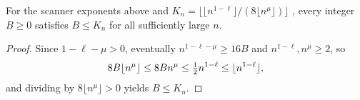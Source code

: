 \begin{lemma}
    \label{thm:area_law_band_count_growth}
    \leanok
    For the scanner exponents above and
    $K_n=\lfloor\lfloor n^{1-\ell}\rfloor/(8\lfloor n^\mu\rfloor)\rfloor$
    \cite[Section~9]{OpenAI2026AreaLaw}, every integer $B\ge0$ satisfies
    $B\le K_n$ for all sufficiently large $n$.
\end{lemma}
\begin{proof}\leanok
    Since $1-\ell-\mu>0$, eventually $n^{1-\ell-\mu}\ge16B$ and
    $n^{1-\ell},n^\mu\ge2$, so
    \begin{align}
        8B\lfloor n^\mu\rfloor
        \le8Bn^\mu
        \le\tfrac12 n^{1-\ell}
        \le\lfloor n^{1-\ell}\rfloor,
        \notag
    \end{align}
    and dividing by $8\lfloor n^\mu\rfloor>0$ yields $B\le K_n$.
\end{proof}


